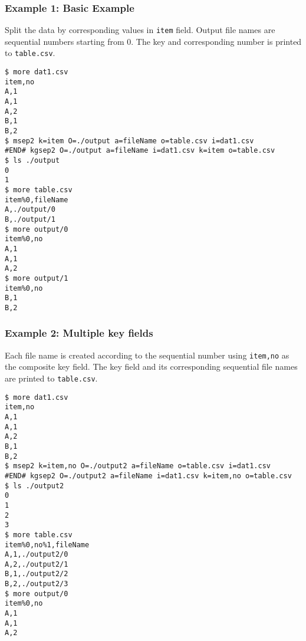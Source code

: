 \subsubsection*{Example 1: Basic Example}

Split the data by corresponding values in \verb|item| field. Output file names are sequential numbers starting from 0. The key and corresponding number is printed to \verb|table.csv|.


\begin{Verbatim}[baselinestretch=0.7,frame=single]
$ more dat1.csv
item,no
A,1
A,1
A,2
B,1
B,2
$ msep2 k=item O=./output a=fileName o=table.csv i=dat1.csv
#END# kgsep2 O=./output a=fileName i=dat1.csv k=item o=table.csv
$ ls ./output
0
1
$ more table.csv
item%0,fileName
A,./output/0
B,./output/1
$ more output/0
item%0,no
A,1
A,1
A,2
$ more output/1
item%0,no
B,1
B,2
\end{Verbatim}
\subsubsection*{Example 2: Multiple key fields}

Each file name is created according to the sequential number using \verb|item,no| as the composite key field. The key field and its corresponding sequential file names are printed to \verb|table.csv|.


\begin{Verbatim}[baselinestretch=0.7,frame=single]
$ more dat1.csv
item,no
A,1
A,1
A,2
B,1
B,2
$ msep2 k=item,no O=./output2 a=fileName o=table.csv i=dat1.csv
#END# kgsep2 O=./output2 a=fileName i=dat1.csv k=item,no o=table.csv
$ ls ./output2
0
1
2
3
$ more table.csv
item%0,no%1,fileName
A,1,./output2/0
A,2,./output2/1
B,1,./output2/2
B,2,./output2/3
$ more output/0
item%0,no
A,1
A,1
A,2
\end{Verbatim}
